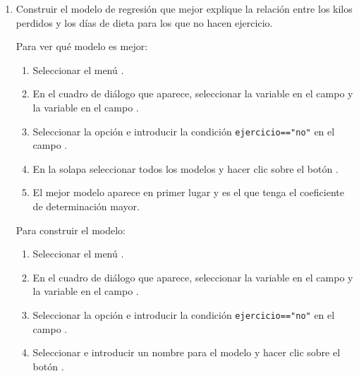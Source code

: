 \begin{enumerate}[leftmargin=*]
\begin{enumerate}
\item Construir el modelo de regresión que mejor explique la relación entre los kilos perdidos y los días de dieta para
los que no hacen ejercicio.
\begin{indicacion}{
Para ver qué modelo es mejor:
\begin{enumerate}
\item Seleccionar el menú .
\item En el cuadro de diálogo que aparece, seleccionar la variable  en el campo  y la variable  en el campo .
\item Seleccionar la opción  e introducir la condición \lstinline{ejercicio=="no"} en el campo .
\item En la solapa  seleccionar todos los modelos y hacer clic sobre el botón .
\item El mejor modelo aparece en primer lugar y es el que tenga el coeficiente de determinación mayor.
\end{enumerate}
Para construir el modelo:
\begin{enumerate}
\item Seleccionar el menú .
\item En el cuadro de diálogo que aparece, seleccionar la variable  en el campo  y la variable  en el campo .
\item Seleccionar la opción  e introducir la condición \lstinline{ejercicio=="no"} en el campo .
\item Seleccionar  e introducir un nombre para el modelo y hacer clic sobre el botón .
\end{enumerate}}
\end{indicacion}


\end{enumerate}
\end{enumerate}
